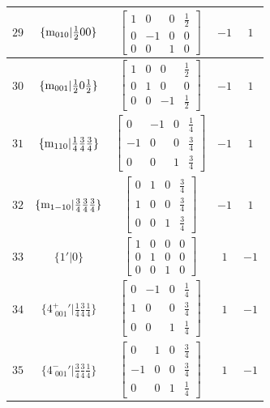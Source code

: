 \documentclass[fleqn,8pt]{jsarticle}
\begin{document}
\begin{longtable}{ccccc}
$ 29 $ & $ \{{\rm m}_{010}|\frac{1}{2} 0 0\} $ & $ \begin{bmatrix} 1 & 0 & 0 & \frac{1}{2} \\ 0 & -1 & 0 & 0 \\ 0 & 0 & 1 & 0 \end{bmatrix} $ & $ -1 $ & $ 1 $ \\ \hline
$ 30 $ & $ \{{\rm m}_{001}|\frac{1}{2} 0 \frac{1}{2}\} $ & $ \begin{bmatrix} 1 & 0 & 0 & \frac{1}{2} \\ 0 & 1 & 0 & 0 \\ 0 & 0 & -1 & \frac{1}{2} \end{bmatrix} $ & $ -1 $ & $ 1 $ \\ \hline
$ 31 $ & $ \{{\rm m}_{110}|\frac{1}{4} \frac{3}{4} \frac{3}{4}\} $ & $ \begin{bmatrix} 0 & -1 & 0 & \frac{1}{4} \\ -1 & 0 & 0 & \frac{3}{4} \\ 0 & 0 & 1 & \frac{3}{4} \end{bmatrix} $ & $ -1 $ & $ 1 $ \\ \hline
$ 32 $ & $ \{{\rm m}_{1-10}|\frac{3}{4} \frac{3}{4} \frac{3}{4}\} $ & $ \begin{bmatrix} 0 & 1 & 0 & \frac{3}{4} \\ 1 & 0 & 0 & \frac{3}{4} \\ 0 & 0 & 1 & \frac{3}{4} \end{bmatrix} $ & $ -1 $ & $ 1 $ \\ \hline
$ 33 $ & $ \{1{}'|0\} $ & $ \begin{bmatrix} 1 & 0 & 0 & 0 \\ 0 & 1 & 0 & 0 \\ 0 & 0 & 1 & 0 \end{bmatrix} $ & $ 1 $ & $ -1 $ \\ \hline
$ 34 $ & $ \{4^{+}_{\,\,001}{}'|\frac{1}{4} \frac{3}{4} \frac{1}{4}\} $ & $ \begin{bmatrix} 0 & -1 & 0 & \frac{1}{4} \\ 1 & 0 & 0 & \frac{3}{4} \\ 0 & 0 & 1 & \frac{1}{4} \end{bmatrix} $ & $ 1 $ & $ -1 $ \\ \hline
$ 35 $ & $ \{4^{-}_{\,\,001}{}'|\frac{3}{4} \frac{3}{4} \frac{1}{4}\} $ & $ \begin{bmatrix} 0 & 1 & 0 & \frac{3}{4} \\ -1 & 0 & 0 & \frac{3}{4} \\ 0 & 0 & 1 & \frac{1}{4} \end{bmatrix} $ & $ 1 $ & $ -1 $ \\ \hline

\end{longtable}
\end{document}

